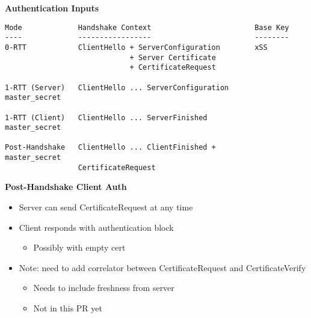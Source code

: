 \documentclass[helvetica]{seminar}
\newcommand{\heading}[1]{%
  \begin{center} 
    \large\bf 
    #1 
  \end{center} 
  \vspace{.4 in}}
\begin{document}
\begin{slide}
\heading{Authentication Inputs}

\vspace{-3ex}
\begin{footnotesize}
\begin{verbatim}
Mode             Handshake Context                        Base Key
----             -----------------                        --------
0-RTT            ClientHello + ServerConfiguration        xSS
                             + Server Certificate
                             + CertificateRequest
                            
1-RTT (Server)   ClientHello ... ServerConfiguration      master_secret
                 
1-RTT (Client)   ClientHello ... ServerFinished           master_secret

Post-Handshake   ClientHello ... ClientFinished +         master_secret
                 CertificateRequest
\end{verbatim}
\end{footnotesize}
\end{slide}

\begin{slide}
\heading{Post-Handshake Client Auth}

\begin{itemize}
\item Server can send CertificateRequest at any time
\item Client responds with authentication block
  \begin{itemize}
  \item Possibly with empty cert
  \end{itemize}

\item Note: need to add correlator between CertificateRequest and CertificateVerify
  \begin{itemize}
  \item Needs to include freshness from server
  \item Not in this PR yet
  \end{itemize}
\end{itemize}

\end{slide}
\end{document}
